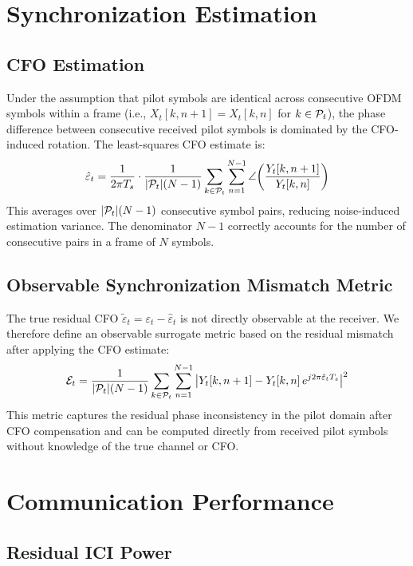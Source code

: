 \section{Synchronization Estimation}

\subsection{CFO Estimation}

Under the assumption that pilot symbols are identical across consecutive OFDM symbols within a frame (i.e., $X_t[k,n+1] = X_t[k,n]$ for $k \in \mathcal{P}_t$), the phase difference between consecutive received pilot symbols is dominated by the CFO-induced rotation. The least-squares CFO estimate is:
\begin{equation}
    \hat{\varepsilon}_t = \frac{1}{2\pi T_s} \cdot \frac{1}{|\mathcal{P}_t|(N-1)} \sum_{k \in \mathcal{P}_t} \sum_{n=1}^{N-1} \angle\!\left(\frac{Y_t[k,n+1]}{Y_t[k,n]}\right)
    \label{eq:cfo_estimator}
\end{equation}
This averages over $|\mathcal{P}_t|(N-1)$ consecutive symbol pairs, reducing noise-induced estimation variance. The denominator $N-1$ correctly accounts for the number of consecutive pairs in a frame of $N$ symbols.

\subsection{Observable Synchronization Mismatch Metric}

The true residual CFO $\tilde{\varepsilon}_t = \varepsilon_t - \hat{\varepsilon}_t$ is not directly observable at the receiver. We therefore define an observable surrogate metric based on the residual mismatch after applying the CFO estimate:
\begin{equation}
    \mathcal{E}_t = \frac{1}{|\mathcal{P}_t|(N-1)} \sum_{k \in \mathcal{P}_t} \sum_{n=1}^{N-1} \left|Y_t[k,n+1] - Y_t[k,n]\, e^{j2\pi\hat{\varepsilon}_t T_s}\right|^2
    \label{eq:sync_mismatch}
\end{equation}
This metric captures the residual phase inconsistency in the pilot domain after CFO compensation and can be computed directly from received pilot symbols without knowledge of the true channel or CFO.

\section{Communication Performance}

\subsection{Residual ICI Power}

